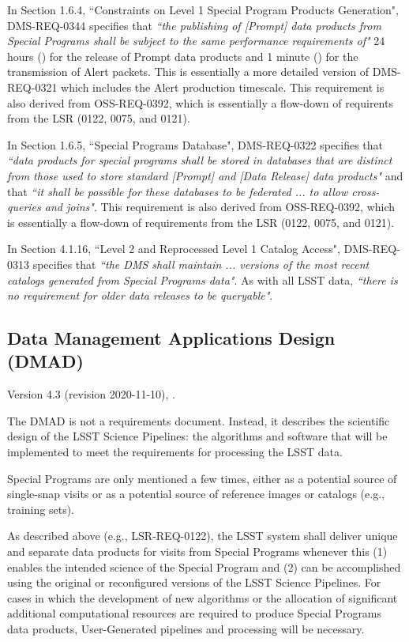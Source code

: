 In Section 1.6.4, ``Constraints on Level 1 Special Program Products Generation", DMS-REQ-0344 specifies that {\it ``the publishing of [Prompt] data products from Special Programs shall be subject to the same performance requirements of"} 24 hours () for the release of Prompt data products and 1 minute () for the transmission of Alert packets.
This is essentially a more detailed version of DMS-REQ-0321 which includes the Alert production timescale.
This requirement is also derived from OSS-REQ-0392, which is essentially a flow-down of requirents from the LSR (0122, 0075, and 0121).

In Section 1.6.5, ``Special Programs Database", DMS-REQ-0322 specifies that {\it ``data products for special programs shall be stored in databases that are distinct from those used to store standard [Prompt] and [Data Release] data products"} and that {\it ``it shall be possible for these databases to be federated ... to allow cross-queries and joins"}.
This requirement is also derived from OSS-REQ-0392, which is essentially a flow-down of requirements from the LSR (0122, 0075, and 0121).

In Section 4.1.16, ``Level 2 and Reprocessed Level 1 Catalog Access", DMS-REQ-0313 specifies that {\it ``the DMS shall maintain ... versions
of the most recent catalogs generated from Special Programs data"}.
As with all LSST data, {\it ``there is no requirement for older data releases to be queryable"}.



\subsection{Data Management Applications Design (DMAD)}

Version 4.3 (revision 2020-11-10), .

The DMAD is not a requirements document.
Instead, it describes the scientific design of the LSST Science Pipelines: the algorithms and software that will be implemented to meet the requirements for processing the LSST data. 

Special Programs are only mentioned a few times, either as a potential source of single-snap visits or as a potential source of reference images or catalogs (e.g., training sets).

As described above (e.g., LSR-REQ-0122), the LSST system shall deliver unique and separate data products for visits from Special Programs whenever this (1) enables the intended science of the Special Program and (2) can be accomplished using the original or reconfigured versions of the LSST Science Pipelines.
For cases in which the development of new algorithms or the allocation of significant additional computational resources are required to produce Special Programs data products, User-Generated pipelines and processing will be necessary.

